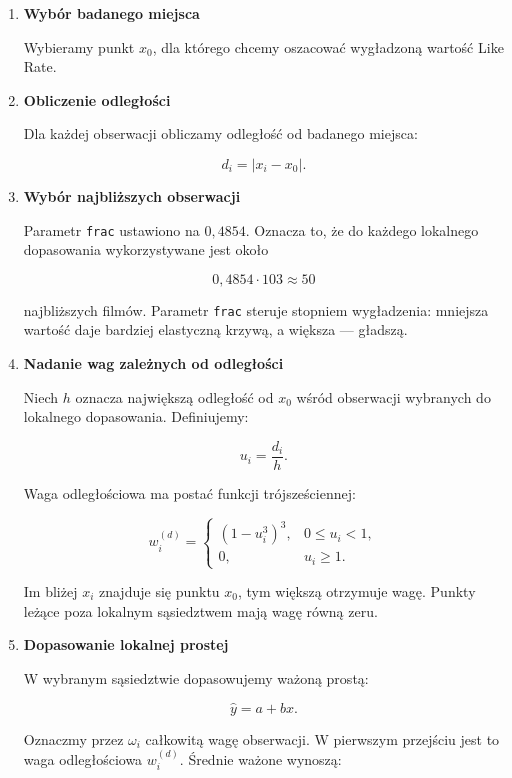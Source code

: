 \documentclass[12pt,a4paper]{article}
\begin{document}
\begin{enumerate}
    \item \textbf{Wybór badanego miejsca}

    Wybieramy punkt $x_0$, dla którego chcemy oszacować wygładzoną wartość Like Rate.

    \item \textbf{Obliczenie odległości}

    Dla każdej obserwacji obliczamy odległość od badanego miejsca:

    \[
    d_i=\lvert x_i-x_0\rvert.
    \]

    \item \textbf{Wybór najbliższych obserwacji}

    Parametr \texttt{frac} ustawiono na $0{,}4854$. Oznacza to, że do każdego lokalnego dopasowania wykorzystywane jest około

    \[
    0{,}4854\cdot 103\approx 50
    \]

    najbliższych filmów. Parametr \texttt{frac} steruje stopniem wygładzenia: mniejsza wartość daje bardziej elastyczną krzywą, a większa --- gładszą.

    \item \textbf{Nadanie wag zależnych od odległości}

    Niech $h$ oznacza największą odległość od $x_0$ wśród obserwacji wybranych do lokalnego dopasowania. Definiujemy:

    \[
    u_i=\frac{d_i}{h}.
    \]

    Waga odległościowa ma postać funkcji trójsześciennej:

    \[
    w_i^{(d)}=
    \begin{cases}
        \left(1-u_i^3\right)^3, & 0\leq u_i<1,\\
        0, & u_i\geq 1.
    \end{cases}
    \]

    Im bliżej $x_i$ znajduje się punktu $x_0$, tym większą otrzymuje wagę. Punkty leżące poza lokalnym sąsiedztwem mają wagę równą zeru.

    \item \textbf{Dopasowanie lokalnej prostej}

    W wybranym sąsiedztwie dopasowujemy ważoną prostą:

    \[
    \widehat{y}=a+bx.
    \]

    Oznaczmy przez $\omega_i$ całkowitą wagę obserwacji. W pierwszym przejściu jest to waga odległościowa $w_i^{(d)}$. Średnie ważone wynoszą:


\end{enumerate}
\end{document}
